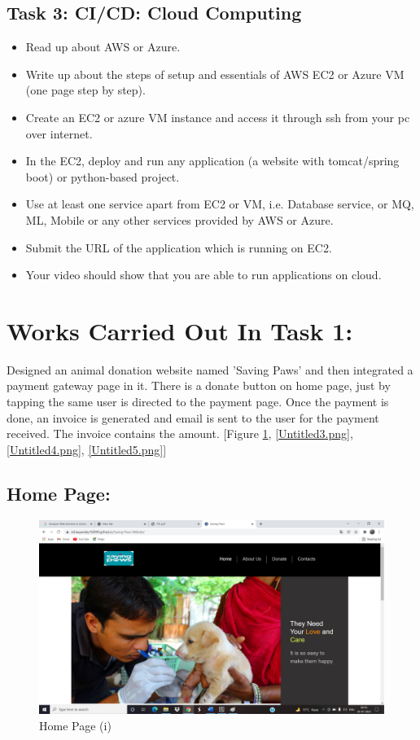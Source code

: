 \documentclass[12pt]{article}
\begin{document}
\subsection{Task 3: CI/CD: Cloud Computing}
\begin{itemize}
\item Read up about AWS or Azure.
\item Write up about the steps of setup and essentials of AWS EC2 or Azure VM (one page step by step).
\item Create an EC2 or azure VM instance and access it through ssh from your pc over internet.
\item In the EC2, deploy and run any application (a website with tomcat/spring boot) or python-based project.
\item Use at least one service apart from EC2 or VM, i.e. Database service, or MQ, ML, Mobile or any other services provided by AWS or Azure.
\item Submit the URL of the application which is running on EC2.
\item Your video should show that you are able to run applications on cloud.
\end{itemize}
\clearpage

\section{Works Carried Out In Task 1:}
Designed an animal donation website named 'Saving Paws' and then integrated a payment gateway page in it. There is a donate button on home page, just by tapping the same user is directed to the payment page. Once the payment is done, an invoice is generated and email is sent to the user for the payment received. The invoice contains the amount. [Figure \ref{Untitled1.png}, \ref{Untitled3.png}, \ref{Untitled4.png}, \ref{Untitled5.png}]

\subsection{Home Page:}
\begin{figure}[h]
\centering
\includegraphics[scale=0.23]{Untitled1.png}
\caption{Home Page (i)}
\label{Untitled1.png}
\end{figure}
\end{document}
